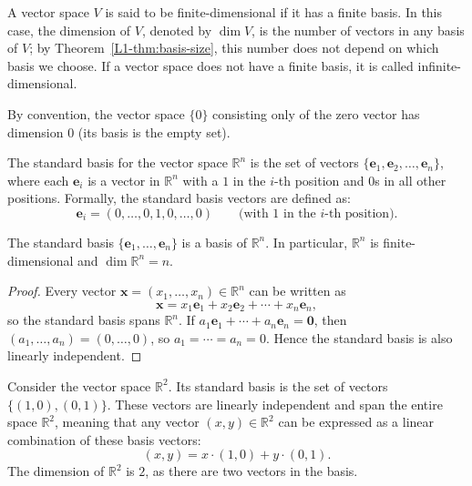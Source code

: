 \begin{definition}[Dimension]
    A vector space $V$ is said to be finite-dimensional if it has a finite basis. In this case, the dimension of $V$, denoted by $\dim V$, is the number of vectors in any basis of $V$; by Theorem~\ref{L1-thm:basis-size}, this number does not depend on which basis we choose. If a vector space does not have a finite basis, it is called infinite-dimensional.

    By convention, the vector space $\{0\}$ consisting only of the zero vector has dimension $0$ (its basis is the empty set).
\end{definition}

\begin{definition}
    The standard basis for the vector space $\mathbb{R}^n$ is the set of vectors $\{\mathbf{e}_1, \mathbf{e}_2, \ldots, \mathbf{e}_n\}$, where each $\mathbf{e}_i$ is a vector in $\mathbb{R}^n$ with a $1$ in the $i$-th position and $0$s in all other positions. Formally, the standard basis vectors are defined as:
    \[\mathbf{e}_i = (0, \ldots, 0, 1, 0, \ldots, 0) \qquad \text{(with $1$ in the $i$-th position)}.\]
\end{definition}

\begin{proposition}
    The standard basis $\{\mathbf{e}_1, \ldots, \mathbf{e}_n\}$ is a basis of $\mathbb{R}^n$. In particular, $\mathbb{R}^n$ is finite-dimensional and $\dim \mathbb{R}^n = n$.
\end{proposition}

\begin{proof}
    Every vector $\mathbf{x} = (x_1, \ldots, x_n) \in \mathbb{R}^n$ can be written as
    \[\mathbf{x} = x_1 \mathbf{e}_1 + x_2 \mathbf{e}_2 + \cdots + x_n \mathbf{e}_n,\]
    so the standard basis spans $\mathbb{R}^n$. If $a_1 \mathbf{e}_1 + \cdots + a_n \mathbf{e}_n = \mathbf{0}$, then $(a_1, \ldots, a_n) = (0, \ldots, 0)$, so $a_1 = \cdots = a_n = 0$. Hence the standard basis is also linearly independent.
\end{proof}

\begin{example}
    Consider the vector space $\mathbb{R}^2$. Its standard basis is the set of vectors $\{(1, 0), (0, 1)\}$. These vectors are linearly independent and span the entire space $\mathbb{R}^2$, meaning that any vector $(x, y) \in \mathbb{R}^2$ can be expressed as a linear combination of these basis vectors:
    \[(x, y) = x \cdot (1, 0) + y \cdot (0, 1).\]
    The dimension of $\mathbb{R}^2$ is $2$, as there are two vectors in the basis.
\end{example}

